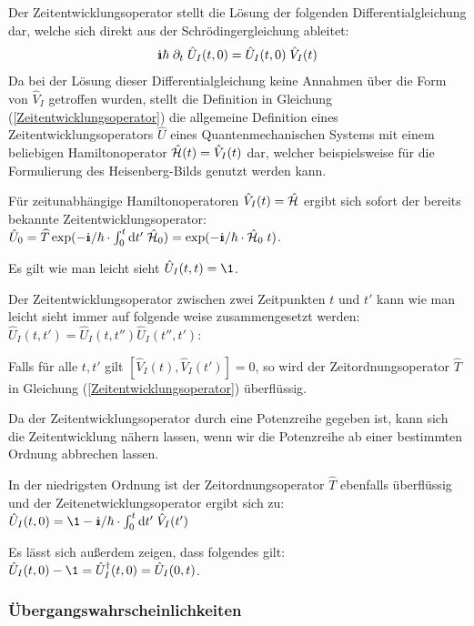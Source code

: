 \begin{itemize1}
	\item Der Zeitentwicklungsoperator stellt die Lösung der folgenden Differentialgleichung dar, welche sich direkt aus der Schrödingergleichung ableitet:
	\begin{eqnarray*}
		\I\hbar\;\dell_t\;\hat{U}_I(t,0) = \hat{U}_I(t,0)\;\hat{V}_I(t)
	\end{eqnarray*}
	Da bei der Lösung dieser Differentialgleichung keine Annahmen über die Form von $\hat{V}_I$ getroffen wurden, stellt die Definition in Gleichung (\ref{Zeitentwicklungsoperator}) die allgemeine Definition eines Zeitentwicklungsoperators $\hat{U}$ eines Quantenmechanischen Systems mit einem beliebigen Hamiltonoperator $\hat{\mathcal H}(t)=\hat{V}_I(t)$ dar, welcher beispielsweise für die Formulierung des Heisenberg-Bilds genutzt werden kann. 
	\item Für zeitunabhängige Hamiltonoperatoren $\hat{V}_I(t)=\hat{\mathcal H}$ ergibt sich sofort der bereits bekannte Zeitentwicklungsoperator: $\hat{U}_0=\widehat{T}\exp(-\I/\hbar\cdot\int_0^t\mathrm{d}t'\;\hat{\ham}_0) = \exp(-\I/\hbar\cdot \hat{\ham}_0\;t)$. 
	\item Es gilt wie man leicht sieht $\hat{U}_I(t,t) = \1$. 
	\item Der Zeitentwicklungsoperator zwischen zwei Zeitpunkten $t$ und $t'$ kann wie man leicht sieht immer auf folgende weise zusammengesetzt werden: $\hat{U}_I(t,t')=\hat{U}_I(t,t'') \hat{U}_I(t'',t')$:
	\item Falls für alle $t,t'$ gilt $[\hat{V}_I(t),\hat{V}_I(t')]=0$, so wird der Zeitordnungsoperator $\widehat{T}$ in Gleichung (\ref{Zeitentwicklungsoperator}) überflüssig.
	\item Da der Zeitentwicklungsoperator durch eine Potenzreihe gegeben ist, kann sich die Zeitentwicklung nähern lassen, wenn wir die Potenzreihe ab einer bestimmten Ordnung abbrechen lassen. 
	\item In der niedrigsten Ordnung ist der Zeitordnungsoperator $\widehat{T}$ ebenfalls überflüssig und der Zeitenetwicklungsoperator ergibt sich zu: $\hat{U}_I(t,0) = \1-\I/\hbar\cdot\int_0^t\mathrm{d}t'\; \hat{V}_I(t')$
	\item Es lässt sich außerdem zeigen, dass folgendes gilt: $\hat{U}_I(t,0)-\1 = \hat{U}_I^{\dagger}(t,0) = \hat{U}_I(0,t)$. 
\end{itemize1}


\subsubsection{Übergangswahrscheinlichkeiten}

